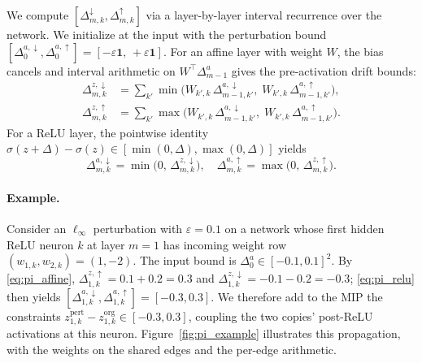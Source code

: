 \documentclass[11pt]{article}
\newcommand{\ep}{\varepsilon}
\begin{document}
We compute $[\Delta^\downarrow_{m,k}, \Delta^\uparrow_{m,k}]$ via a layer-by-layer interval recurrence over the network. We initialize at the input with the perturbation bound $[\Delta^{a,\downarrow}_0, \Delta^{a,\uparrow}_0] = [-\ep \mathbf{1},\, +\ep \mathbf{1}]$. For an affine layer with weight $W$, the bias cancels and interval arithmetic on $W^\top \Delta^a_{m-1}$ gives the pre-activation drift bounds:
\begin{align}
  \Delta^{z,\downarrow}_{m,k} &= \textstyle\sum_{k'} \min\!\bigl(W_{k',k}\, \Delta^{a,\downarrow}_{m-1,k'},\; W_{k',k}\, \Delta^{a,\uparrow}_{m-1,k'}\bigr), \nonumber \\
  \Delta^{z,\uparrow}_{m,k}   &= \textstyle\sum_{k'} \max\!\bigl(W_{k',k}\, \Delta^{a,\downarrow}_{m-1,k'},\; W_{k',k}\, \Delta^{a,\uparrow}_{m-1,k'}\bigr).
  \label{eq:pi_affine}
\end{align}
For a ReLU layer, the pointwise identity $\sigma(z+\Delta) - \sigma(z) \in [\min(0,\Delta), \max(0,\Delta)]$ yields
\begin{equation}
  \Delta^{a,\downarrow}_{m,k} = \min\!\bigl(0,\, \Delta^{z,\downarrow}_{m,k}\bigr), \quad
  \Delta^{a,\uparrow}_{m,k}   = \max\!\bigl(0,\, \Delta^{z,\uparrow}_{m,k}\bigr).
  \label{eq:pi_relu}
\end{equation}

\paragraph{Example.}
Consider an $\ell_\infty$ perturbation with $\ep = 0.1$ on a network whose first hidden ReLU neuron
$k$ at layer $m=1$ has incoming weight row $(w_{1,k}, w_{2,k}) = (1, -2)$. The input bound is $\Delta^a_0 \in [-0.1, 0.1]^2$. By \eqref{eq:pi_affine}, $\Delta^{z,\uparrow}_{1,k} = 0.1 + 0.2 = 0.3$ and $\Delta^{z,\downarrow}_{1,k} = -0.1 - 0.2 = -0.3$; \eqref{eq:pi_relu} then yields $[\Delta^{a,\downarrow}_{1,k}, \Delta^{a,\uparrow}_{1,k}] = [-0.3, 0.3]$. We therefore add to the MIP the constraints $z^{\mathrm{pert}}_{1,k} - z^{\mathrm{org}}_{1,k} \in [-0.3, 0.3]$, coupling the two copies' post-ReLU activations at this neuron. Figure~\ref{fig:pi_example} illustrates this propagation, with the weights on the shared edges and the per-edge arithmetic.
\end{document}
